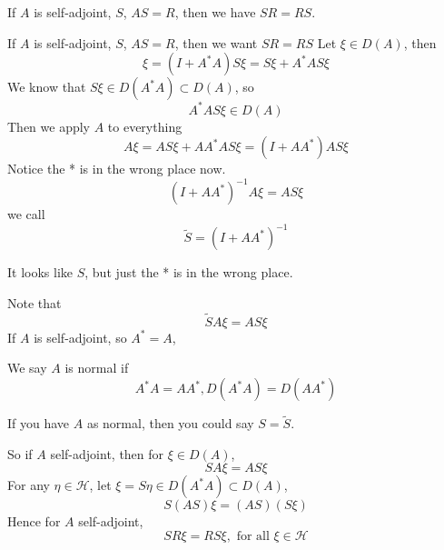 \begin{theorem}
    If $A$ is self-adjoint, $S$, $AS=R$, then we have $SR=RS$. 
\end{theorem}
If $A$ is self-adjoint, $S$, $AS=R$, then we want
$SR=RS$ Let $\xi\in D(A)$, then
\begin{equation*}
    \xi=(I+A^*A)S\xi=S\xi+A^*AS\xi
\end{equation*}
We know that $S\xi\in D(A^*A)\subset D(A)$, so
\begin{equation*}
    A^*AS\xi\in D(A)
\end{equation*} 
Then we apply $A$ to everything
\begin{equation*}
    A\xi=AS\xi+AA^*AS\xi=(I+AA^*)AS\xi
\end{equation*}
Notice the * is in the wrong place now.
\begin{equation*}
    (I+AA^*)^{-1}A\xi=AS\xi
\end{equation*}
we call
\begin{equation*}
    \tilde{S}=(I+AA^*)^{-1}
\end{equation*}
\begin{note}
    It looks like $S$, but just the * is in the wrong place.
\end{note}
Note that 
\begin{equation*}
    \tilde{S}A\xi=AS\xi
\end{equation*}
If $A$ is self-adjoint, so $A^*=A$, \begin{definition}
    We say $A$ is normal if 
    \begin{equation*}
        A^*A=AA^*, D(A^*A)=D(AA^*)
    \end{equation*}
\end{definition}
If you have $A$ as normal, then you could say $S=\tilde{S}$.

So if $A$ self-adjoint, then for $\xi\in D(A)$, 
\begin{equation*}
    SA\xi=AS\xi
\end{equation*}
For any $\eta\in\mathcal{H}$, let $\xi=S\eta\in D(A^*A)\subset D(A)$, 
\begin{equation*}
    S(AS)\xi=(AS)(S\xi)
\end{equation*}
Hence for $A$ self-adjoint,
\begin{equation*}
    SR\xi=RS\xi, \text{ for all }\xi\in\mathcal{H}
\end{equation*}


